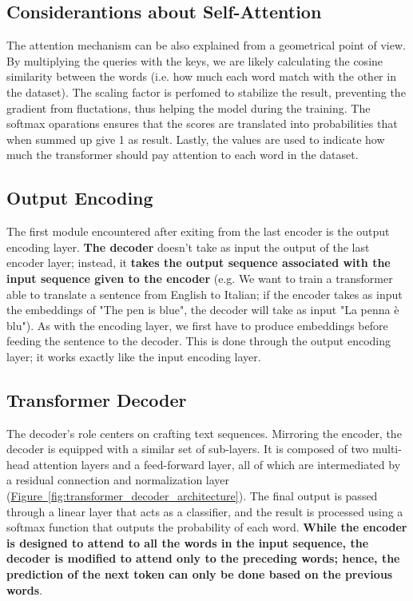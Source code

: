 \documentclass[12pt]{article}
\begin{document}
\subsection{Considerantions about Self-Attention}
The attention mechanism can be also explained from a geometrical point of view. By multiplying the queries with the keys, we are 
likely calculating the cosine similarity between the words (i.e. how much each word match with the other in the dataset). The 
scaling factor is perfomed to stabilize the result, preventing the gradient from fluctations, thus helping the model during the
training. The softmax oparations ensures that the scores are translated into probabilities that when summed up give 1 as result.
Lastly, the values are used to indicate how much the transformer should pay attention to each word in the dataset. 

\subsection{Output Encoding}
The first module encountered after exiting from the last encoder is the output encoding layer. \textbf{The decoder} doesn't 
take as input the output of the last encoder layer; instead, it \textbf{takes the output sequence associated with the 
input sequence given to the encoder} (e.g. We want to train a transformer able to translate a sentence from 
English to Italian; if the encoder takes as input the embeddings of "The pen is blue", the decoder will take 
as input "La penna è blu"). As with the encoding layer, we first have to produce embeddings before feeding the 
sentence to the decoder. This is done through the output encoding layer; it works exactly like the input encoding 
layer.

\subsection{Transformer Decoder}
The decoder's role centers on crafting text sequences. Mirroring the encoder, the decoder is equipped with 
a similar set of sub-layers. It is composed of two multi-head attention layers and a feed-forward layer, all 
of which are intermediated by a residual connection and normalization layer (\hyperref[fig:transformer_decoder_architecture]{Figure~\ref*{fig:transformer_decoder_architecture}}). 
The final output is passed through a linear layer that acts as a classifier, and the result is processed using 
a softmax function that outputs the probability of each word. \textbf{While the encoder is designed to attend to all 
the words in the input sequence, the decoder is modified to attend only to the preceding words; hence, the prediction 
of the next token can only be done based on the previous words}.
\end{document}
